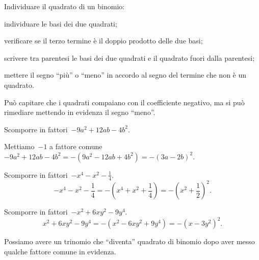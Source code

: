 \begin{procedura}
Individuare il quadrato di un binomio:
\begin{enumeratea}
\item individuare le basi dei due quadrati;
\item verificare se il terzo termine è il doppio prodotto delle due basi;
\item scrivere tra parentesi le basi dei due quadrati e il quadrato fuori dalla parentesi;
\item mettere il segno ``più'' o ``meno'' in accordo al segno del termine che non è un quadrato.
\end{enumeratea}
\end{procedura}

Può capitare che i quadrati compaiano con il coefficiente negativo, ma si può rimediare mettendo in evidenza il segno ``meno''.

\begin{exrig}
 \begin{esempio}
Scomporre in fattori~$-9a^{2}+12{ab}-4b^{2}$.

Mettiamo~$-1$ a fattore comune~$-9a^{2}+12ab-4b^{2}=-(9a^{2}-12{ab}+4b^{2})=-(3a-2b)^{2}$.
 \end{esempio}

 \begin{esempio}
Scomporre in fattori~$-x^{4}-x^{2}-\frac{1}{4}$.
\[-x^{4}-x^{2}-\frac{1}{4}=-\left(x^{4}+x^{2}+\frac{1}{4}\right)=-\left(x^{2}+\frac{1}{2}\right)^{2}.\]
 \end{esempio}

 \begin{esempio}
Scomporre in fattori~$-x^{2}+6xy^{2}-9y^{4}$.
\[x^{2}+6xy^{2}-9y^{4}=-\left(x^{2}-6xy^{2}+9y^{4}\right)=-\left(x-3y^{2}\right)^{2}.\]
 \end{esempio}
\end{exrig}

Possiamo avere un trinomio che ``diventa'' quadrato di binomio dopo aver messo qualche fattore comune in evidenza.

